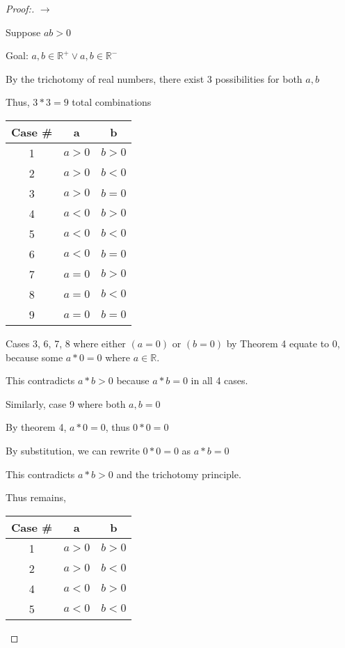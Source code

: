 \documentclass[12pt]{article}
\begin{document}
\begin{proof}[Proof:]

    \textbf{$\longrightarrow$}

    Suppose $ab > 0$
    
    Goal: $a, b \in \mathbb{R^+} \lor a, b \in \mathbb{R^-}$

    By the trichotomy of real numbers, there exist 3 possibilities for both $a, b$

    Thus, $3 * 3 = 9$ total combinations

    \begin{center}
        \begin{tabular}{|c|c|c|}
            \hline
            \textbf{Case \#} & a & b \\
            \hline
            1 & $a > 0$ & $b > 0$ \\ 
            2 & $a > 0$ & $b < 0$ \\  
            3 & $a > 0$ & $b = 0$ \\  
            4 & $a < 0$ & $b > 0$ \\ 
            5 & $a < 0$ & $b < 0$ \\ 
            6 & $a < 0$ & $b = 0$ \\ 
            7 & $a = 0$ & $b > 0$ \\ 
            8 & $a = 0$ & $b < 0$ \\  
            9 & $a = 0$ & $b = 0$ \\  
            \hline
        \end{tabular}
    \end{center}

    Cases 3, 6, 7, 8 where either $(a = 0)$ or $(b = 0)$ by Theorem 4 equate to 0, because some $a * 0 = 0$ where $a \in \mathbb{R}$.
    
    This contradicts $a * b > 0$ because $a * b = 0$ in all 4 cases.

    Similarly, case 9 where both $a, b = 0$

    By theorem 4, $a * 0 = 0$, thus $0 * 0 = 0$

    By substitution, we can rewrite $0 * 0 = 0$ as $a * b = 0$

    This contradicts $a * b > 0$ and the trichotomy principle.

    Thus remains, 

    \begin{center}
        \begin{tabular}{|c|c|c|}
            \hline
            \textbf{Case \#} & a & b \\
            \hline
            1 & $a > 0$ & $b > 0$ \\ 
            2 & $a > 0$ & $b < 0$ \\  
            4 & $a < 0$ & $b > 0$ \\ 
            5 & $a < 0$ & $b < 0$ \\ 
            \hline
        \end{tabular}
    \end{center}


\end{proof}
\end{document}
